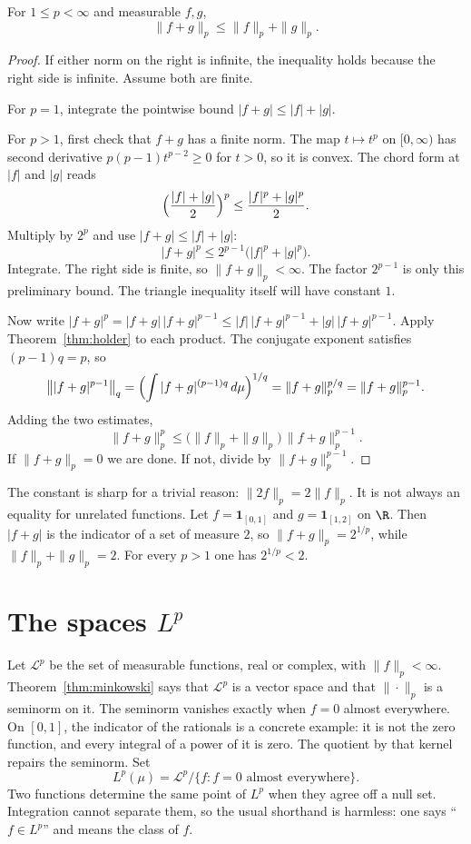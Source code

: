 \begin{theorem}\label{thm:minkowski}
For $1\le p<\infty$ and measurable $f,g$,
\[\|f+g\|_p\le\|f\|_p+\|g\|_p.\]
\end{theorem}
\begin{proof}
If either norm on the right is infinite, the inequality holds because the right side is infinite. Assume both are finite.

For $p=1$, integrate the pointwise bound $|f+g|\le|f|+|g|$.

For $p>1$, first check that $f+g$ has a finite norm. The map $t\mapsto t^p$ on $[0,\infty)$ has second derivative $p(p-1)t^{p-2}\ge0$ for $t>0$, so it is convex. The chord form at $|f|$ and $|g|$ reads
\[\Bigl(\frac{|f|+|g|}2\Bigr)^p\le\frac{|f|^p+|g|^p}2.\]
Multiply by $2^p$ and use $|f+g|\le|f|+|g|$:
\[|f+g|^p\le 2^{p-1}\bigl(|f|^p+|g|^p\bigr).\]
Integrate. The right side is finite, so $\|f+g\|_p<\infty$. The factor $2^{p-1}$ is only this preliminary bound. The triangle inequality itself will have constant $1$.

Now write $|f+g|^p=|f+g|\,|f+g|^{p-1}\le|f|\,|f+g|^{p-1}+|g|\,|f+g|^{p-1}$. Apply Theorem~\ref{thm:holder} to each product. The conjugate exponent satisfies $(p-1)q=p$, so
\[\bigl\||f+g|^{p-1}\bigr\|_q=\Bigl(\int|f+g|^{(p-1)q}\,d\mu\Bigr)^{1/q}=\|f+g\|_p^{p/q}=\|f+g\|_p^{p-1}.\]
Adding the two estimates,
\[\|f+g\|_p^p\le\bigl(\|f\|_p+\|g\|_p\bigr)\,\|f+g\|_p^{p-1}.\]
If $\|f+g\|_p=0$ we are done. If not, divide by $\|f+g\|_p^{p-1}$.
\end{proof}

The constant is sharp for a trivial reason: $\|2f\|_p=2\|f\|_p$. It is not always an equality for unrelated functions. Let $f=\mathbf 1_{[0,1]}$ and $g=\mathbf 1_{[1,2]}$ on $\R$. Then $|f+g|$ is the indicator of a set of measure $2$, so $\|f+g\|_p=2^{1/p}$, while $\|f\|_p+\|g\|_p=2$. For every $p>1$ one has $2^{1/p}<2$.

\section{The spaces \texorpdfstring{$L^p$}{Lp}}

Let $\mathcal L^p$ be the set of measurable functions, real or complex, with $\|f\|_p<\infty$. Theorem~\ref{thm:minkowski} says that $\mathcal L^p$ is a vector space and that $\|\cdot\|_p$ is a seminorm on it. The seminorm vanishes exactly when $f=0$ almost everywhere. On $[0,1]$, the indicator of the rationals is a concrete example: it is not the zero function, and every integral of a power of it is zero. The quotient by that kernel repairs the seminorm. Set
\[L^p(\mu)=\mathcal L^p\big/\bigl\{f:f=0\text{ almost everywhere}\bigr\}.\]
Two functions determine the same point of $L^p$ when they agree off a null set. Integration cannot separate them, so the usual shorthand is harmless: one says ``$f\in L^p$'' and means the class of $f$.

